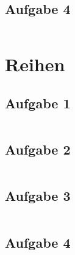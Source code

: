 \subsection{Aufgabe 4}
\[  \]
\[  \]
\[  \]

\section{Reihen}
\subsection{Aufgabe 1}
\[  \]
\[  \]
\[  \]

\subsection{Aufgabe 2}
\[  \]
\[  \]
\[  \]

\subsection{Aufgabe 3}
\[  \]
\[  \]
\[  \]

\subsection{Aufgabe 4}
\[  \]
\[  \]
\[  \]
